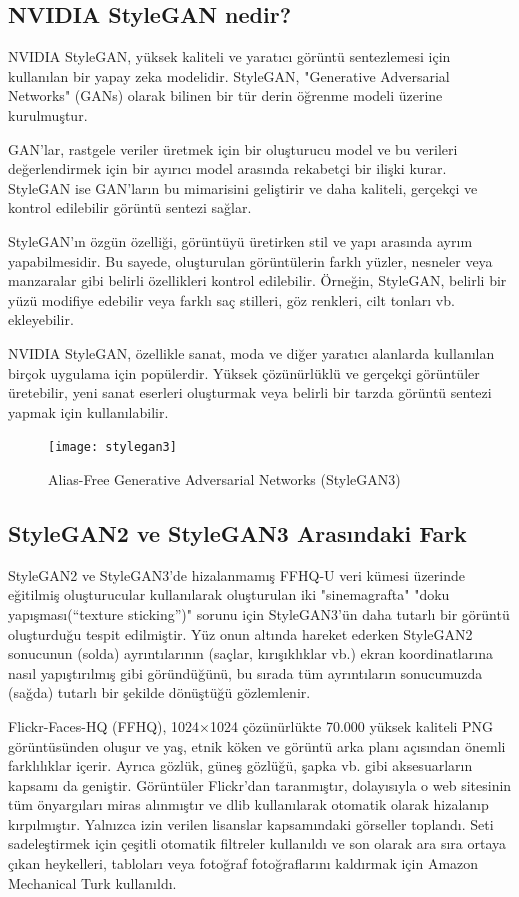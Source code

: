 \documentclass[12pt, a4paper]{article}
\begin{document}
	\subsection{NVIDIA StyleGAN nedir?}
	NVIDIA StyleGAN, yüksek kaliteli ve yaratıcı görüntü sentezlemesi için kullanılan bir yapay zeka modelidir. StyleGAN, "Generative Adversarial Networks" (GANs) olarak bilinen bir tür derin öğrenme modeli üzerine kurulmuştur.
	
	GAN'lar, rastgele veriler üretmek için bir oluşturucu model ve bu verileri değerlendirmek için bir ayırıcı model arasında rekabetçi bir ilişki kurar. StyleGAN ise GAN'ların bu mimarisini geliştirir ve daha kaliteli, gerçekçi ve kontrol edilebilir görüntü sentezi sağlar.
	
	StyleGAN'ın özgün özelliği, görüntüyü üretirken stil ve yapı arasında ayrım yapabilmesidir. Bu sayede, oluşturulan görüntülerin farklı yüzler, nesneler veya manzaralar gibi belirli özellikleri kontrol edilebilir. Örneğin, StyleGAN, belirli bir yüzü modifiye edebilir veya farklı saç stilleri, göz renkleri, cilt tonları vb. ekleyebilir.
	
	NVIDIA StyleGAN, özellikle sanat, moda ve diğer yaratıcı alanlarda kullanılan birçok uygulama için popülerdir. Yüksek çözünürlüklü ve gerçekçi görüntüler üretebilir, yeni sanat eserleri oluşturmak veya belirli bir tarzda görüntü sentezi yapmak için kullanılabilir.
	\begin{figure}[h]
		\centering
		\texttt{[image: stylegan3]}
		\label{stylegan3}
		\caption{Alias-Free Generative Adversarial Networks (StyleGAN3)\cite{-2024-05-31}}
	\end{figure}
	\FloatBarrier
	\subsection{StyleGAN2 ve StyleGAN3 Arasındaki Fark}
	StyleGAN2 ve StyleGAN3'de hizalanmamış FFHQ-U veri kümesi üzerinde eğitilmiş oluşturucular kullanılarak oluşturulan iki "sinemagrafta" "doku yapışması(“texture sticking”)" sorunu için StyleGAN3'ün daha tutarlı bir görüntü oluşturduğu tespit edilmiştir. Yüz onun altında hareket ederken StyleGAN2 sonucunun (solda) ayrıntılarının (saçlar, kırışıklıklar vb.) ekran koordinatlarına nasıl yapıştırılmış gibi göründüğünü, bu sırada tüm ayrıntıların sonucumuzda (sağda) tutarlı bir şekilde dönüştüğü gözlemlenir.
	
	Flickr-Faces-HQ (FFHQ)\cite{karras2019style}, 1024×1024 çözünürlükte 70.000 yüksek kaliteli PNG görüntüsünden oluşur ve yaş, etnik köken ve görüntü arka planı açısından önemli farklılıklar içerir. Ayrıca gözlük, güneş gözlüğü, şapka vb. gibi aksesuarların kapsamı da geniştir. Görüntüler Flickr'dan taranmıştır, dolayısıyla o web sitesinin tüm önyargıları miras alınmıştır ve dlib kullanılarak otomatik olarak hizalanıp kırpılmıştır. Yalnızca izin verilen lisanslar kapsamındaki görseller toplandı. Seti sadeleştirmek için çeşitli otomatik filtreler kullanıldı ve son olarak ara sıra ortaya çıkan heykelleri, tabloları veya fotoğraf fotoğraflarını kaldırmak için Amazon Mechanical Turk kullanıldı.
	
\end{document}
